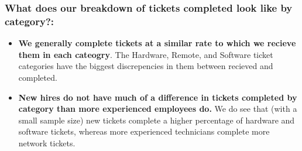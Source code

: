 \documentclass[11pt]{article}
\begin{document}
\hypertarget{what-does-our-breakdown-of-tickets-completed-look-like-by-category}{%
\subsubsection{What does our breakdown of tickets completed look like by
category?:}\label{what-does-our-breakdown-of-tickets-completed-look-like-by-category}}

\begin{itemize}
\item
  \textbf{We generally complete tickets at a similar rate to which we
  recieve them in each cateogry}. The Hardware, Remote, and Software
  ticket categories have the biggest discrepencies in them between
  recieved and completed.
\item
  \textbf{New hires do not have much of a difference in tickets
  completed by category than more experienced employees do.} We do see
  that (with a small sample size) new tickets complete a higher
  percentage of hardware and software tickets, whereas more experienced
  technicians complete more network tickets.
\end{itemize}



    
    
    
\end{document}
